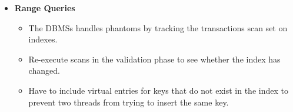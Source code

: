 \documentclass[11pt]{article}
\begin{document}
\begin{itemize}
    \item \textbf{Range Queries}
    \begin{itemize}
        \item
        The DBMSs handles phantoms by tracking the transactions scan set on indexes.
        
        \item
        Re-execute scans in the validation phase to see whether the index has changed.
        
        \item
        Have to include virtual entries for keys that do not exist in the index to prevent two 
        threads from trying to insert the same key.
    \end{itemize}
\end{itemize}

\newpage


\end{document}
